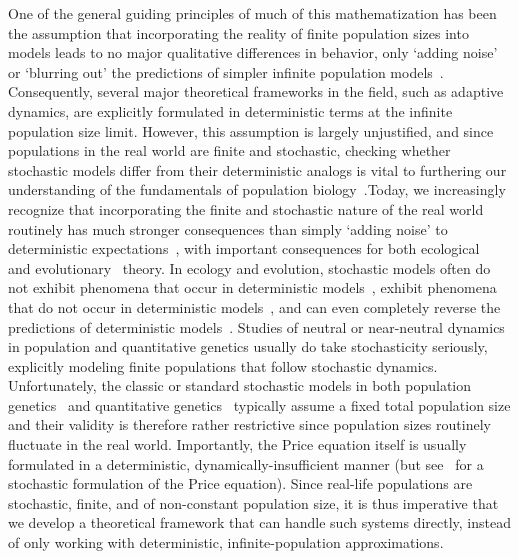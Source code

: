 One of the general guiding principles of much of this mathematization has been the assumption that incorporating the reality of finite population sizes into models leads to no major qualitative differences in behavior, only `adding noise' or `blurring out' the predictions of simpler infinite population models~\citep{page_unifying_2002}. Consequently, several major theoretical frameworks in the field, such as adaptive dynamics, are explicitly formulated in deterministic terms at the infinite population size limit. However, this assumption is largely unjustified, and since populations in the real world are finite and stochastic, checking whether stochastic models differ from their deterministic analogs is vital to furthering our understanding of the fundamentals of population biology~\citep{hastings_transients_2004, coulson_skeletons_2004, shoemaker_integrating_2020}.Today, we increasingly recognize that incorporating the finite and stochastic nature of the real world routinely has much stronger consequences than simply `adding noise' to deterministic expectations~\citep{boettiger_noise_2018}, with important consequences for both ecological~\citep{schreiber_does_2022} and evolutionary~\citep{delong_stochasticity_2023} theory. In ecology and evolution, stochastic models often do not exhibit phenomena that occur in deterministic models~\citep{proulx_what_2005, johansson_will_2006, claessen_delayed_2007,  wakano_evolutionary_2013, debarre_evolutionary_2016, johnson_two-dimensional_2021}, exhibit phenomena that do not occur in deterministic models~\citep{rogers_demographic_2012, rogers_spontaneous_2012, rogers_modes_2015, veller_drift-induced_2017, delong_stochasticity_2023}, and can even completely reverse the predictions of deterministic models~\citep{houchmandzadeh_selection_2012,houchmandzadeh_fluctuation_2015,constable_demographic_2016,mcleod_social_2019}. Studies of neutral or near-neutral dynamics in population and quantitative genetics usually do take stochasticity seriously, explicitly modeling finite populations that follow stochastic dynamics. Unfortunately, the classic or standard stochastic models in both population genetics~\citep{fisher_genetical_1930,wright_evolution_1931, moran_random_1958, kimura_diffusion_1964} and quantitative genetics~\citep{crow_introduction_1970, lande_natural_1976} typically assume a fixed total population size and their validity is therefore rather restrictive since population sizes routinely fluctuate in the real world. Importantly, the Price equation itself is usually formulated in a deterministic, dynamically-insufficient manner (but see~\cite{rice_stochastic_2008} for a stochastic formulation of the Price equation). Since real-life populations are stochastic, finite, and of non-constant population size, it is thus imperative that we develop a theoretical framework that can handle such systems directly, instead of only working with deterministic, infinite-population approximations.

